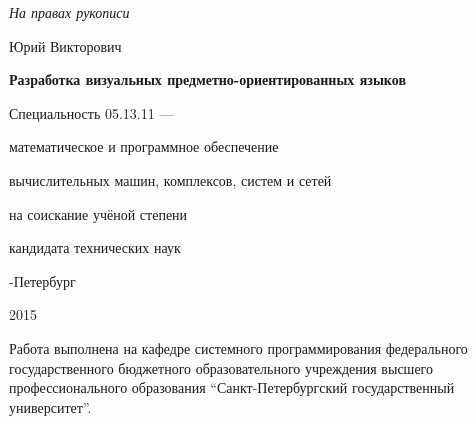 \newcommand{\sfs}{\fontsize{12pt}{12pt}\selectfont}
\sfs %
\thispagestyle{empty}

\vspace{10mm}
\begin{flushright}
  \Large\textit{На правах рукописи}
\end{flushright}

\vspace{25mm}
\begin{center}
{\Large{} Юрий Викторович}
\end{center}

\vspace{20mm}
\begin{center}
{\bf \LARGE Разработка визуальных предметно-ориентированных языков
\par}

\vspace{20mm}
{\Large
Специальность 05.13.11 ---\par
математическое и программное обеспечение\par
вычислительных машин, комплексов, систем и сетей
}

\vspace{15mm}
\par
{} на соискание учёной степени\par
кандидата технических наук
\end{center}

\vspace{35mm}
\begin{center}
{-Петербург\par 2015}
\end{center}

\newpage
\thispagestyle{empty}

\small{
\noindent Работа выполнена на кафедре системного программирования федерального государственного
бюджетного образовательного учреждения высшего профессионального образования "`Санкт-Петербургский
государственный университет"'.
}

